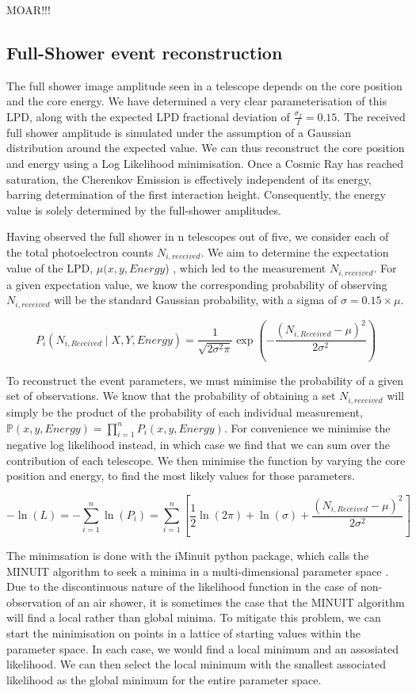 \documentclass[11pt]{article}
\begin{document}
MOAR!!!

\subsection{Full-Shower event reconstruction}
The full shower image amplitude seen in a telescope depends on the core position and the core energy. We have determined a very clear parameterisation of this LPD, along with the expected LPD fractional deviation of $\frac{\sigma_{I}}{I}= 0.15$. The received full shower amplitude is simulated under the assumption of a Gaussian distribution around the expected value. We can thus reconstruct the core position and energy using a Log Likelihood minimisation. Once a Cosmic Ray has reached saturation, the Cherenkov Emission is effectively independent of its energy, barring determination of the first interaction height. Consequently, the energy value is solely determined by the full-shower amplitudes. 

Having observed the full shower in n telescopes out of five, we consider each of the total photoelectron counts $N_{i, received}$. We aim to determine the expectation value of the LPD, $\mu(x, y, Energy$) , which led to the measurement $N_{i, received}$. For a given expectation value, we know the corresponding probability of observing $N_{i, received}$ will be the standard Gaussian probability, with a sigma of $\sigma = 0.15 \times \mu$.

\[  P_{i} ( N_{i, Received} \mid X, Y, Energy )  =  \frac{1}{\sqrt{2 \sigma^{2} \pi}} \exp(-\frac{(N_{i, Received} - \mu)^{2}}{2 \sigma^{2}}) \]

To reconstruct the event parameters, we must minimise the probability of a given set of observations. We know that the probability of obtaining a set $N_{i,received}$ will simply be the product of the probability of each individual measurement, $\mathbb{P}(x, y, Energy) = \prod_{i=1}^{n} P_{i}(x, y, Energy)$. For convenience we minimise the negative log likelihood instead, in which case we find that we can sum over the contribution of each telescope. We then minimise the function by varying the core position and energy, to find the most likely values for those parameters.

\[ - \ln(L) = - \sum_{i=1}^{n} \ln(P_{i}) =  \sum_{i=1}^{n} [ \frac{1}{2}\ln(2 \pi) + \ln(\sigma) + \frac{(N_{i, Received} - \mu)^{2}}{2 \sigma^{2}}]\]

The minimsation is done with the iMinuit python package, which calls the MINUIT algorithm to seek a minima in a multi-dimensional parameter space \cite{James75}. Due to the discontinuous nature of the likelihood function in the case of non-observation of an air shower, it is sometimes the case that the MINUIT algorithm will find a local rather than global minima. To mitigate this problem, we can start the minimisation on points in a lattice of starting values within the parameter space. In each case, we would find a local minimum and an assosiated likelihood. We can then select the local minimum with the smallest associated likelihood as the global minimum for the entire parameter space. 
\end{document}
